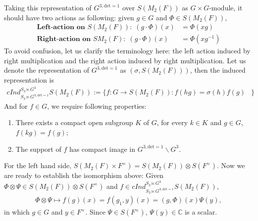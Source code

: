 \documentclass[12pt,a4paper,english]{article}
\theoremstyle{plain}
\theoremstyle{definition}
\begin{document}
Taking this representation of $G^{3,\text{det}=1}$ over $S(M_{2}(F))$ as $G\times G$-module, it should have two actions as following: given $g\in G$ and $\Phi\in S(M_{2}(F))$,
\begin{align*}
     \textbf{Left-action on $S(M_{2}(F))$:}\ \ (g\cdot \Phi)(x)&=\Phi(xg)\\
     \textbf{Right-action on $SM_{2}(F)$:}\ \ (g\cdot \Phi)(x)&=\Phi(xg^{-1})
\end{align*}
To avoid confusion, let us clarify the terminology here: the left action induced by right multiplication and the right action induced by right multiplication. 
Let us denote the representation of $G^{3, \text{det}=1}$ as $(\sigma, S(M_{2}(F)))$, then the induced representation is 
\begin{align*}
       cInd^{S_{3}\ltimes G^{3}}_{S_{3}\ltimes G^{3,\text{det}=1}}S(M_{2}(F)):=\big\{f:G\rightarrow S(M_{2}(F)): f(hg)=\sigma(h)f(g)&\big\}
\end{align*}
And for $f\in G$, we require following properties:    
\begin{enumerate}
    \item There exists a compact open subgroup $K$ of $G$, for every $k\in K$ and $g\in G$, $f(kg)=f(g)$;
    \item The support of $f$ has compact image in $G^{3, \text{det}=1}\backslash G^{3}$.
\end{enumerate}
For the left hand side, $S(M_{2}(F)\times F^{\times})= S(M_{2}(F))\otimes S(F^{\times})$. Now we are ready to establish the isomorphism above: Given $\Phi\otimes \Psi\in S(M_{2}(F))\otimes S(F^{\times})$ and $f\in   cInd^{S_{3}\ltimes G^{3}}_{S_{3}\ltimes G^{3,\text{det}=1}}S(M_{2}(F))$,
\begin{align*}
    \Phi\otimes \Psi \mapsto f(g)(x)=f(g_{1},y)(x)=(g,\Phi)(x)\Psi(y),
\end{align*}
in which $g\in G$ and $y\in F^{\times }$. Since $\Psi\in S(F^{\times})$, $\Psi(y)\in \mathbb{C}$ is a scalar.
\end{document}
